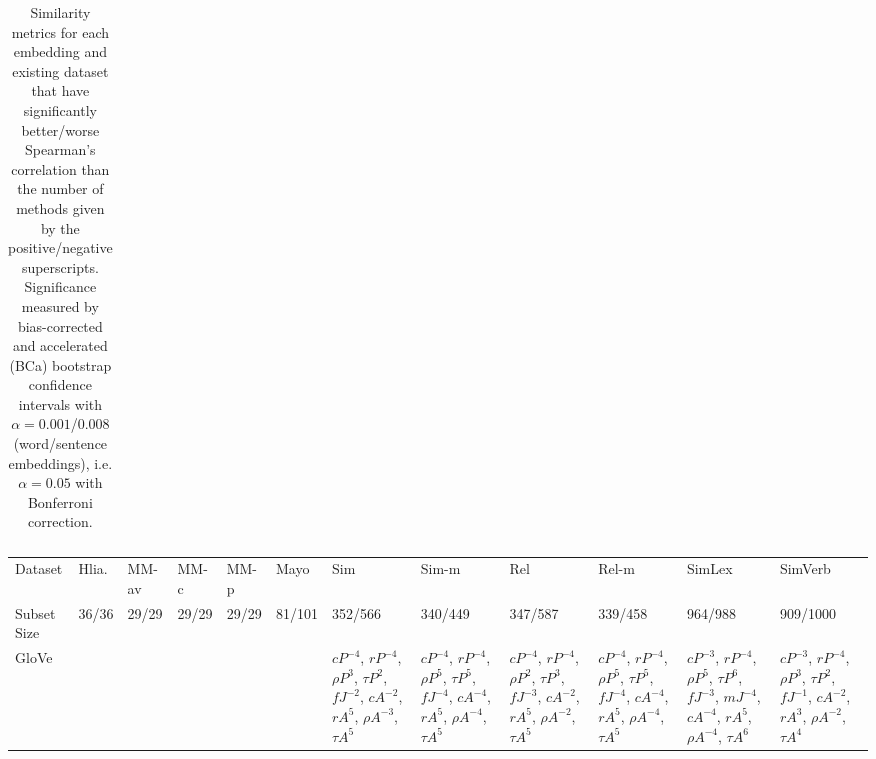 \documentclass[letterpaper]{article} %
\begin{document}
\begin{sidewaystable*}
\begin{tabular}{l l l l l l l l l l l l}
\bottomrule
    \end{tabular}
\caption{Similarity metrics for each embedding and existing dataset that have significantly better/worse Spearman's correlation than the number of methods given by the positive/negative superscripts. Significance measured by bias-corrected and accelerated (BCa)
bootstrap confidence intervals with $\alpha = 0.001$/$0.008$ (word/sentence embeddings), i.e. $\alpha = 0.05$ with Bonferroni correction.}
    \label{tab:significance_existingDatasets_methods2} 
\end{sidewaystable*}


\begin{sidewaystable*}
    \centering
    \small
    \begin{tabular}{l l l l l l l l l l l l}
    \toprule
         Dataset & Hlia. & MM-av & MM-c & MM-p & Mayo & Sim & Sim-m & Rel & Rel-m & SimLex & SimVerb\\ 
Subset Size & 36/36 & 29/29 & 29/29 & 29/29 & 81/101 & 352/566 & 340/449 & 347/587 & 339/458 & 964/988 & 909/1000\\
\midrule
\multirow{8}{1.5cm}{GloVe} & \multirow{8}{1.5cm}{} & \multirow{8}{1.5cm}{} & \multirow{8}{1.5cm}{} & \multirow{8}{1.5cm}{} & \multirow{8}{1.5cm}{} & \multirow{8}{1.5cm}{$cP^{-4}$, $r P^{-4}$, $\rho P^{3}$, $\tau P^{2}$, $fJ^{-2}$, $cA^{-2}$, $r A^{5}$, $\rho A^{-3}$, $\tau A^{5}$} & \multirow{8}{1.5cm}{$cP^{-4}$, $r P^{-4}$, $\rho P^{5}$, $\tau P^{5}$, $fJ^{-4}$, $cA^{-4}$, $r A^{5}$, $\rho A^{-4}$, $\tau A^{5}$} & \multirow{8}{1.5cm}{$cP^{-4}$, $r P^{-4}$, $\rho P^{2}$, $\tau P^{3}$, $fJ^{-3}$, $cA^{-2}$, $r A^{5}$, $\rho A^{-2}$, $\tau A^{5}$} & \multirow{8}{1.5cm}{$cP^{-4}$, $r P^{-4}$, $\rho P^{5}$, $\tau P^{5}$, $fJ^{-4}$, $cA^{-4}$, $r A^{5}$, $\rho A^{-4}$, $\tau A^{5}$} & \multirow{8}{1.5cm}{$cP^{-3}$, $r P^{-4}$, $\rho P^{5}$, $\tau P^{6}$, $fJ^{-3}$, $mJ^{-4}$, $cA^{-4}$, $r A^{5}$, $\rho A^{-4}$, $\tau A^{6}$} & \multirow{8}{1.5cm}{$cP^{-3}$, $r P^{-4}$, $\rho P^{3}$, $\tau P^{2}$, $fJ^{-1}$, $cA^{-2}$, $r A^{3}$, $\rho A^{-2}$, $\tau A^{4}$} \\ \\ \\ \\ \\ \\ \\ \\
\midrule

\end{tabular}
\end{sidewaystable*}
\end{document}
